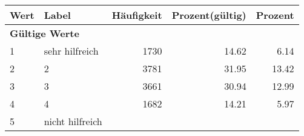      \begin{longtable}{lXrrr}
     \toprule
     \textbf{Wert} & \textbf{Label} & \textbf{Häufigkeit} & \textbf{Prozent(gültig)} & \textbf{Prozent} \\
     \endhead
     \midrule
     \multicolumn{5}{l}{\textbf{Gültige Werte}}\\

     1 &
     \multicolumn{1}{X}{ sehr hilfreich   } &


       \num{1730} &
       \num[round-mode=places,round-precision=2]{14.62} &
         \num[round-mode=places,round-precision=2]{6.14} \\

     2 &
     \multicolumn{1}{X}{ 2   } &


       \num{3781} &
       \num[round-mode=places,round-precision=2]{31.95} &
         \num[round-mode=places,round-precision=2]{13.42} \\

     3 &
     \multicolumn{1}{X}{ 3   } &


       \num{3661} &
       \num[round-mode=places,round-precision=2]{30.94} &
         \num[round-mode=places,round-precision=2]{12.99} \\

     4 &
     \multicolumn{1}{X}{ 4   } &


       \num{1682} &
       \num[round-mode=places,round-precision=2]{14.21} &
         \num[round-mode=places,round-precision=2]{5.97} \\

     5 &
     \multicolumn{1}{X}{ nicht hilfreich   } &



\end{longtable}
